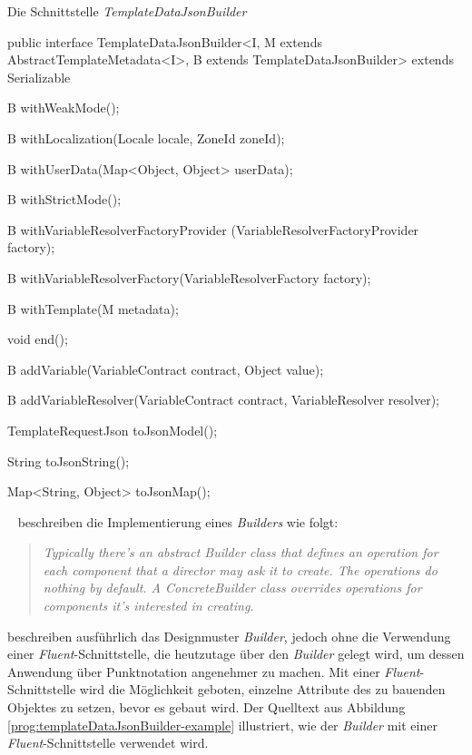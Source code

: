 \begin{program}
\caption{Die Schnittstelle \emph{TemplateDataJsonBuilder}}
\label{prog:templateDataJsonBuilder}
\begin{JavaCode}
public interface TemplateDataJsonBuilder<I,
    M extends AbstractTemplateMetadata<I>,
    B extends TemplateDataJsonBuilder> extends Serializable {

    B withWeakMode();

    B withLocalization(Locale locale,
                       ZoneId zoneId);

    B withUserData(Map<Object, Object> userData);

    B withStrictMode();

    B withVariableResolverFactoryProvider
                         (VariableResolverFactoryProvider factory);

    B withVariableResolverFactory(VariableResolverFactory factory);

    B withTemplate(M metadata);

    void end();

    B addVariable(VariableContract contract,
                  Object value);

    B addVariableResolver(VariableContract contract,
                          VariableResolver resolver);

    TemplateRequestJson toJsonModel();

    String toJsonString();

    Map<String, Object> toJsonMap();
}
\end{JavaCode}
\end{program}
\ \newline 
\cite[100]{designPatterns} beschreiben die Implementierung eines \emph{Builders} wie folgt:
\begin{quote}
\emph{Typically there's an abstract Builder class that defines an operation for each component that a director may ask it to create. The operations do nothing by default. A ConcreteBuilder class overrides operations for components it's interested in creating.}
\end{quote}
\cite[96 - 106]{designPatterns} beschreiben ausführlich das Designmuster \emph{Builder}, jedoch ohne die Verwendung einer \emph{Fluent}-Schnittstelle, die heutzutage über den \emph{Builder} gelegt wird, um dessen Anwendung über Punktnotation angenehmer zu machen. Mit einer \emph{Fluent}-Schnittstelle wird die Möglichkeit geboten, einzelne Attribute des zu bauenden Objektes zu setzen, bevor es gebaut wird. Der Quelltext aus Abbildung \ref{prog:templateDataJsonBuilder-example} illustriert, wie der \emph{Builder} mit einer \emph{Fluent}-Schnittstelle verwendet wird.

